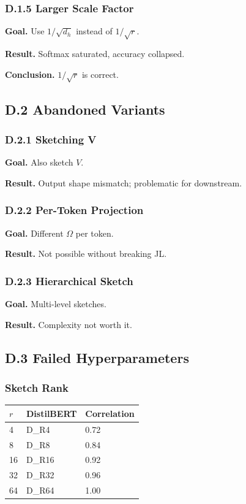 \subsubsection{D.1.5 Larger Scale Factor}

\textbf{Goal.} Use $1/\sqrt{d_h}$ instead of $1/\sqrt{r}$.

\textbf{Result.} Softmax saturated, accuracy collapsed.

\textbf{Conclusion.} $1/\sqrt{r}$ is correct.

\subsection{D.2 Abandoned Variants}

\subsubsection{D.2.1 Sketching V}

\textbf{Goal.} Also sketch $V$.

\textbf{Result.} Output shape mismatch; problematic for downstream.

\subsubsection{D.2.2 Per-Token Projection}

\textbf{Goal.} Different $\Omega$ per token.

\textbf{Result.} Not possible without breaking JL.

\subsubsection{D.2.3 Hierarchical Sketch}

\textbf{Goal.} Multi-level sketches.

\textbf{Result.} Complexity not worth it.

\subsection{D.3 Failed Hyperparameters}

\subsubsection{Sketch Rank}

\begin{table}[H]
\centering
\small
\begin{tabular}{lll}
\toprule
\textbf{$r$} & \textbf{DistilBERT} & \textbf{Correlation} \\
\midrule
4 & {{D\_R4}} & 0.72 \\
8 & {{D\_R8}} & 0.84 \\
16 & {{D\_R16}} & 0.92 \\
32 & {{D\_R32}} & 0.96 \\
64 & {{D\_R64}} & 1.00 \\
\bottomrule
\end{tabular}
\end{table}

